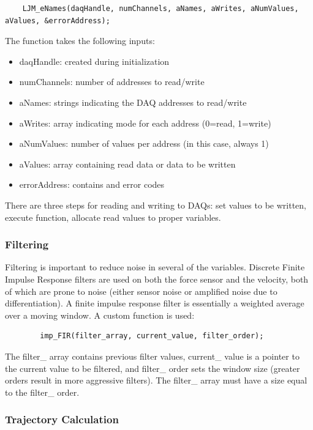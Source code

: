 \documentclass{article}
\begin{document}
	\begin{verbatim}
	LJM_eNames(daqHandle, numChannels, aNames, aWrites, aNumValues, aValues, &errorAddress);
	\end{verbatim}
	
	The function takes the following inputs:
	
	\begin{itemize}
		\item daqHandle: created during initialization
		\item numChannels: number of addresses to read/write 
		\item aNames: strings indicating the DAQ addresses to read/write
		\item aWrites: array indicating mode for each address (0=read, 1=write)
		\item aNumValues: number of values per address (in this case, always 1)
		\item aValues: array containing read data or data to be written
		\item errorAddress: contains and error codes 
	\end{itemize}
	
	There are three steps for reading and writing to DAQs: set values to be written, execute function, allocate read values to proper variables.  
	
	\subsubsection{Filtering}

	Filtering is important to reduce noise in several of the variables. Discrete Finite Impulse Response filters are used on both the force sensor and the velocity, both of which are prone to noise (either sensor noise or amplified noise due to differentiation). A finite impulse response filter is essentially a weighted average over a moving window. A custom function is used: 
	
	\begin{verbatim}
		imp_FIR(filter_array, current_value, filter_order);
	\end{verbatim}
	
	The filter\_ array contains previous filter values, current\_ value is a pointer to the current value to be filtered, and filter\_ order sets the window size (greater orders result in more aggressive filters). The filter\_ array must have a size equal to the filter\_ order.
	
	\subsubsection{Trajectory Calculation}
\end{document}
